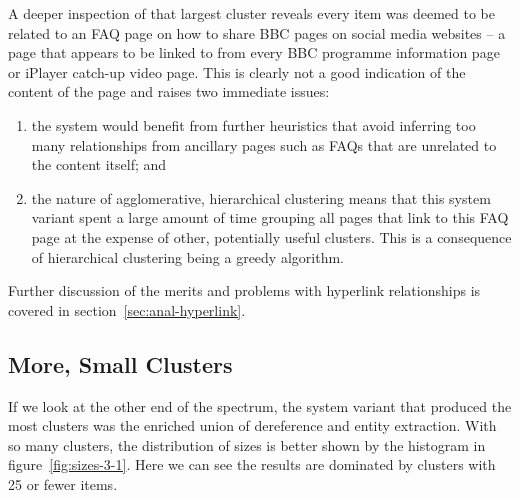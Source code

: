 A deeper inspection of that largest cluster reveals every item was
deemed to be related to an FAQ page on how to share BBC pages on
social media websites -- a page that appears to be linked to from
every BBC programme information page or iPlayer catch-up video page.
This is clearly not a good indication of the content of the page
and raises two immediate issues:

\begin{enumerate}
\item the system would benefit from further heuristics that avoid
  inferring too many relationships from ancillary pages such as FAQs
  that are unrelated to the content itself; and
\item the nature of agglomerative, hierarchical clustering means
  that this system variant spent a large amount of time grouping all
  pages that link to this FAQ page at the expense of other,
  potentially useful clusters. This is a consequence of hierarchical
  clustering being a greedy algorithm.
\end{enumerate}

Further discussion of the merits and problems with hyperlink
relationships is covered in section~\ref{sec:anal-hyperlink}.

\subsection{More, Small Clusters}

If we look at the other end of the spectrum, the system variant
that produced the most clusters was the enriched union of dereference
and entity extraction. With so many clusters, the distribution of
sizes is better shown by the histogram in figure~\ref{fig:sizes-3-1}.
Here we can see the results are dominated by clusters with 25 or
fewer items.

\begin{sidewaysfigure}
  \caption{Distribution of cluster sizes produced by the enriched union of dereference and entity extraction}
  \label{fig:sizes-3-1}
\end{sidewaysfigure}

